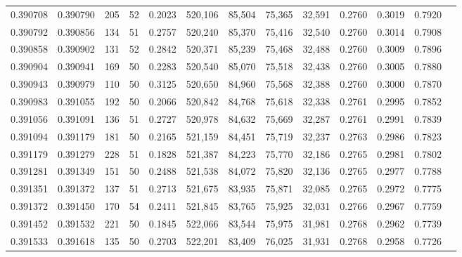 \begin{tabular}{rrrrrrrrrrrrr}
0.390708 & 0.390790 &   205 &  52 &                                     0.2023 & 520,106 &  85,504 &  75,365 &  32,591 & 0.2760 & 0.3019 & 0.7920 \\
0.390792 & 0.390856 &   134 &  51 &                                     0.2757 & 520,240 &  85,370 &  75,416 &  32,540 & 0.2760 & 0.3014 & 0.7908 \\
0.390858 & 0.390902 &   131 &  52 &                                     0.2842 & 520,371 &  85,239 &  75,468 &  32,488 & 0.2760 & 0.3009 & 0.7896 \\
0.390904 & 0.390941 &   169 &  50 &                                     0.2283 & 520,540 &  85,070 &  75,518 &  32,438 & 0.2760 & 0.3005 & 0.7880 \\
0.390943 & 0.390979 &   110 &  50 &                                     0.3125 & 520,650 &  84,960 &  75,568 &  32,388 & 0.2760 & 0.3000 & 0.7870 \\
0.390983 & 0.391055 &   192 &  50 &                                     0.2066 & 520,842 &  84,768 &  75,618 &  32,338 & 0.2761 & 0.2995 & 0.7852 \\
0.391056 & 0.391091 &   136 &  51 &                                     0.2727 & 520,978 &  84,632 &  75,669 &  32,287 & 0.2761 & 0.2991 & 0.7839 \\
0.391094 & 0.391179 &   181 &  50 &                                     0.2165 & 521,159 &  84,451 &  75,719 &  32,237 & 0.2763 & 0.2986 & 0.7823 \\
0.391179 & 0.391279 &   228 &  51 &                                     0.1828 & 521,387 &  84,223 &  75,770 &  32,186 & 0.2765 & 0.2981 & 0.7802 \\
0.391281 & 0.391349 &   151 &  50 &                                     0.2488 & 521,538 &  84,072 &  75,820 &  32,136 & 0.2765 & 0.2977 & 0.7788 \\
0.391351 & 0.391372 &   137 &  51 &                                     0.2713 & 521,675 &  83,935 &  75,871 &  32,085 & 0.2765 & 0.2972 & 0.7775 \\
0.391372 & 0.391450 &   170 &  54 &                                     0.2411 & 521,845 &  83,765 &  75,925 &  32,031 & 0.2766 & 0.2967 & 0.7759 \\
0.391452 & 0.391532 &   221 &  50 &                                     0.1845 & 522,066 &  83,544 &  75,975 &  31,981 & 0.2768 & 0.2962 & 0.7739 \\
0.391533 & 0.391618 &   135 &  50 &                                     0.2703 & 522,201 &  83,409 &  76,025 &  31,931 & 0.2768 & 0.2958 & 0.7726 \\

\end{tabular}
